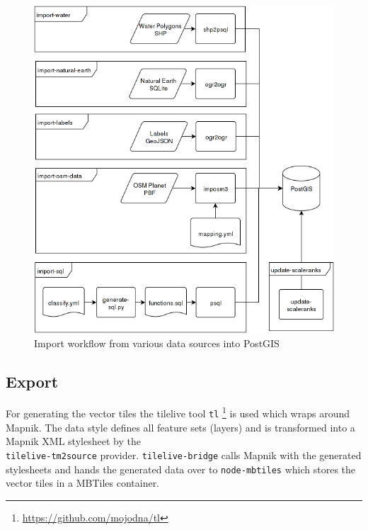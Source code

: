 \begin{figure}[H]
\centering
  \includegraphics[scale=0.6]{images/import_package_flow.png}
  \caption{Import workflow from various data sources into PostGIS}
\end{figure}

\newpage
\subsection{Export}\label{workflow-export}

For generating the vector tiles the tilelive tool \texttt{tl} \footnote{\url{https://github.com/mojodna/tl}} is used which wraps
around Mapnik. 
The data style defines all feature sets (layers) and is transformed into a Mapnik XML stylesheet by the \\
\texttt{tilelive-tm2source} provider.
\texttt{tilelive-bridge} calls Mapnik with the generated stylesheets and hands the generated data over to \texttt{node-mbtiles} which stores the vector tiles in a MBTiles container.

